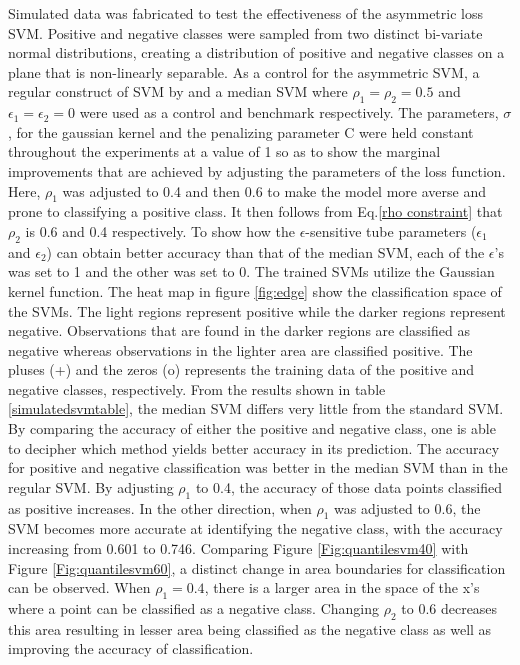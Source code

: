 Simulated data was fabricated to test the effectiveness of the asymmetric loss SVM. Positive and negative classes were sampled from two distinct bi-variate normal distributions, creating a distribution of positive and negative classes on a plane that is non-linearly separable. As a control for the asymmetric SVM, a regular construct of SVM by \citet{Vapnik98} and a median SVM where $\rho_1=\rho_2=0.5$ and $\epsilon_1=\epsilon_2=0$ were used as a control and benchmark respectively. The parameters, $\sigma$, for the gaussian kernel and the penalizing parameter C were held constant throughout the experiments at a value of 1 so as to show the marginal improvements that are achieved by adjusting the parameters of the loss function. Here, $\rho_1$ was adjusted to 0.4 and then 0.6 to make the model more averse and prone to classifying a positive class. It then follows from Eq.\ref{rho constraint} that $\rho_2$ is 0.6 and 0.4 respectively. To show how the $\epsilon$-sensitive tube parameters ($\epsilon_1$ and $\epsilon_2$) can obtain better accuracy than that of the median SVM, each of the $\epsilon$'s was set to 1 and the other was set to 0. The trained SVMs utilize the Gaussian kernel function. The heat map in figure \ref{fig:edge} show the classification space of the SVMs. The light regions represent positive while the darker regions represent negative. Observations that are found in the darker regions are classified as negative whereas observations in the lighter area are classified positive. The pluses (+) and the zeros (o) represents the training data of the positive and negative classes, respectively. From the results shown in table \ref{simulatedsvmtable}, the median SVM differs very little from the standard SVM. By comparing the accuracy of either the positive and negative class, one is able to decipher which method yields better accuracy in its prediction. The accuracy for positive and negative classification was better in the median SVM than in the regular SVM. By adjusting $\rho_1$ to 0.4, the accuracy of those data points classified as positive increases. In the other direction, when $\rho_1$ was adjusted to 0.6, the SVM becomes more accurate at identifying the negative class, with the accuracy increasing from 0.601 to 0.746. Comparing Figure \ref{Fig:quantilesvm40} with Figure \ref{Fig:quantilesvm60}, a distinct change in area boundaries for classification can be observed. When $\rho_1=0.4$, there is a larger area in the space of the x's where a point can be classified as a negative class. Changing $\rho_2$ to 0.6 decreases this area resulting in lesser area being classified as the negative class as well as improving the accuracy of classification.
